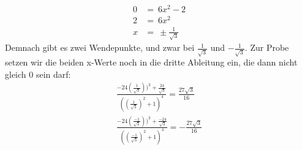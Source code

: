 \documentclass[a4paper,11pt]{article}
\begin{document}
\begin{enumerate}
\begin{enumerate}
\begin{align*}
                    0 &=\ 6x^2-2\\
                    2 &=\ 6x^2\\
                    x &=\ \pm \frac{1}{\sqrt{3}}
                \end{align*}
                Demnach gibt es zwei Wendepunkte, und zwar bei $\frac{1}{\sqrt{3}}$ und $-\frac{1}{\sqrt{3}}$.
                Zur Probe setzen wir die beiden x-Werte noch in die dritte Ableitung ein, die dann nicht gleich 0 sein darf:
                \begin{align*}
                    \frac{-24(\frac{1}{\sqrt{3}}))^3+\frac{24}{\sqrt{3}}}{((\frac{1}{\sqrt{3}})^2+1)^4} = \frac{27 \sqrt{3}}{16}\\
                    \frac{-24(\frac{-1}{\sqrt{3}}))^3+\frac{-24}{\sqrt{3}}}{((\frac{-1}{\sqrt{3}})^2+1)^4} = -\frac{27 \sqrt{3}}{16}
                \end{align*}
            \end{enumerate}

    \end{enumerate}
\end{document}
